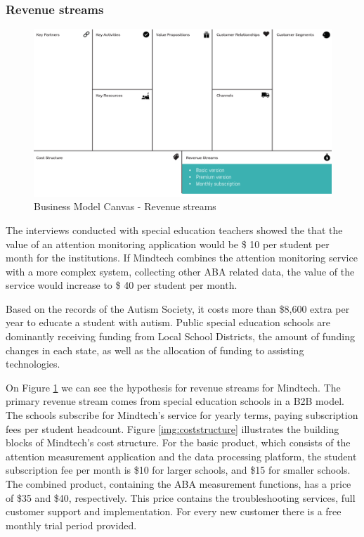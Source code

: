 \documentclass[letterpaper,10pt]{article}
\begin{document}
\subsubsection{Revenue streams}

\begin{figure}[!htb]
\centering
\includegraphics[scale=0.5]{rev.PNG}
\caption{Business Model Canvas - Revenue streams}
\label{img:BMC_revstream}
\end{figure}

The interviews conducted with special education teachers showed the that the value of an attention monitoring application would be \$ 10 per student per month for the institutions. If Mindtech combines the attention monitoring service with a more complex system, collecting other ABA related data, the value of the service would increase to \$ 40 per student per month.

Based on the records of the Autism Society, it costs more than \$8,600 extra per year to educate a student with autism. \cite{autism_society} Public special education schools are dominantly receiving funding from Local School Districts, the amount of funding changes in each state, as well as the allocation of funding to assisting technologies. 




On Figure \ref{img:BMC_revstream} we can see the hypothesis for revenue streams for Mindtech. The primary revenue stream comes from special education schools in a B2B model. The schools subscribe for Mindtech’s service for yearly terms, paying subscription fees per student headcount. Figure \ref{img:coststructure} illustrates the building blocks of Mindtech's cost structure. For the basic product, which consists of the attention measurement application and the data processing platform, the student subscription fee per month is \$10 for larger schools, and \$15 for smaller schools. The combined product, containing the ABA measurement functions, has a price of \$35 and \$40, respectively. This price contains the troubleshooting services, full customer support and implementation. For every new customer there is a free monthly trial period provided.
\end{document}
